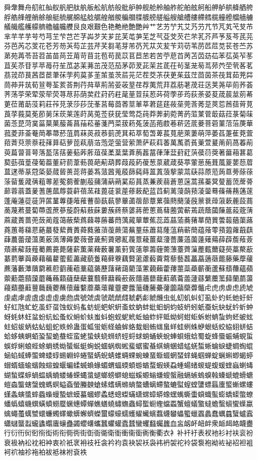 舜舝舞舟舠舡舢舣舤舥舦舧舨舩航舫般舭舮舯舰舱舲舳舴舵舶舷舸船舺舻舼舽舾舿艀艁艂艃艄艅艆艇艈艉艊艋艌艍艎艏艐艑艒艓艔艕艖艗艘艙艚艛艜艝艞艟艠艡艢艣艤艥艦艧艨艩艪艫艬艭艮良艰艱色艳艴艵艶艷艸艹艺艻艼艽艾艿芀芁节芃芄芅芆芇芈芉芊芋芌芍芎芏芐芑芒芓芔芕芖芗芘芙芚芛芜芝芞芟芠芡芢芣芤芥芦芧芨芩芪芫芬芭芮芯芰花芲芳芴芵芶芷芸芹芺芻芼芽芾芿苀苁苂苃苄苅苆苇苈苉苊苋苌苍苎苏苐苑苒苓苔苕苖苗苘苙苚苛苜苝苞苟苠苡苢苣苤若苦苧苨苩苪苫苬苭苮苯苰英苲苳苴苵苶苷苸苹苺苻苼苽苾苿茀茁茂范茄茅茆茇茈茉茊茋茌茍茎茏茐茑茒茓茔茕茖茗茘茙茚茛茜茝茞茟茠茡茢茣茤茥茦茧茨茩茪茫茬茭茮茯茰茱茲茳茴茵茶茷茸茹茺茻茼茽茾茿荀荁荂荃荄荅荆荇荈草荊荋荌荍荎荏荐荑荒荓荔荕荖荗荘荙荚荛荜荝荞荟荠荡荢荣荤荥荦荧荨荩荪荫荬荭荮药荰荱荲荳荴荵荶荷荸荹荺荻荼荽荾荿莀莁莂莃莄莅莆莇莈莉莊莋莌莍莎莏莐莑莒莓莔莕莖莗莘莙莚莛莜莝莞莟莠莡莢莣莤莥莦莧莨莩莪莫莬莭莮莯莰莱莲莳莴莵莶获莸莹莺莻莼莽莾莿菀菁菂菃菄菅菆菇菈菉菊菋菌菍菎菏菐菑菒菓菔菕菖菗菘菙菚菛菜菝菞菟菠菡菢菣菤菥菦菧菨菩菪菫菬菭菮華菰菱菲菳菴菵菶菷菸菹菺菻菼菽菾菿萀萁萂萃萄萅萆萇萈萉萊萋萌萍萎萏萐萑萒萓萔萕萖萗萘萙萚萛萜萝萞萟萠萡萢萣萤营萦萧萨萩萪萫萬萭萮萯萰萱萲萳萴萵萶萷萸萹萺萻萼落萾萿葀葁葂葃葄葅葆葇葈葉葊葋葌葍葎葏葐葑葒葓葔葕葖著葘葙葚葛葜葝葞葟葠葡葢董葤葥葦葧葨葩葪葫葬葭葮葯葰葱葲葳葴葵葶葷葸葹葺葻葼葽葾葿蒀蒁蒂蒃蒄蒅蒆蒇蒈蒉蒊蒋蒌蒍蒎蒏蒐蒑蒒蒓蒔蒕蒖蒗蒘蒙蒚蒛蒜蒝蒞蒟蒠蒡蒢蒣蒤蒥蒦蒧蒨蒩蒪蒫蒬蒭蒮蒯蒰蒱蒲蒳蒴蒵蒶蒷蒸蒹蒺蒻蒼蒽蒾蒿蓀蓁蓂蓃蓄蓅蓆蓇蓈蓉蓊蓋蓌蓍蓎蓏蓐蓑蓒蓓蓔蓕蓖蓗蓘蓙蓚蓛蓜蓝蓞蓟蓠蓡蓢蓣蓤蓥蓦蓧蓨蓩蓪蓫蓬蓭蓮蓯蓰蓱蓲蓳蓴蓵蓶蓷蓸蓹蓺蓻蓼蓽蓾蓿蔀蔁蔂蔃蔄蔅蔆蔇蔈蔉蔊蔋蔌蔍蔎蔏蔐蔑蔒蔓蔔蔕蔖蔗蔘蔙蔚蔛蔜蔝蔞蔟蔠蔡蔢蔣蔤蔥蔦蔧蔨蔩蔪蔫蔬蔭蔮蔯蔰蔱蔲蔳蔴蔵蔶蔷蔸蔹蔺蔻蔼蔽蔾蔿蕀蕁蕂蕃蕄蕅蕆蕇蕈蕉蕊蕋蕌蕍蕎蕏蕐蕑蕒蕓蕔蕕蕖蕗蕘蕙蕚蕛蕜蕝蕞蕟蕠蕡蕢蕣蕤蕥蕦蕧蕨蕩蕪蕫蕬蕭蕮蕯蕰蕱蕲蕳蕴蕵蕶蕷蕸蕹蕺蕻蕼蕽蕾蕿薀薁薂薃薄薅薆薇薈薉薊薋薌薍薎薏薐薑薒薓薔薕薖薗薘薙薚薛薜薝薞薟薠薡薢薣薤薥薦薧薨薩薪薫薬薭薮薯薰薱薲薳薴薵薶薷薸薹薺薻薼薽薾薿藀藁藂藃藄藅藆藇藈藉藊藋藌藍藎藏藐藑藒藓藔藕藖藗藘藙藚藛藜藝藞藟藠藡藢藣藤藥藦藧藨藩藪藫藬藭藮藯藰藱藲藳藴藵藶藷藸藹藺藻藼藽藾藿蘀蘁蘂蘃蘄蘅蘆蘇蘈蘉蘊蘋蘌蘍蘎蘏蘐蘑蘒蘓蘔蘕蘖蘗蘘蘙蘚蘛蘜蘝蘞蘟蘠蘡蘢蘣蘤蘥蘦蘧蘨蘩蘪蘫蘬蘭蘮蘯蘰蘱蘲蘳蘴蘵蘶蘷蘸蘹蘺蘻蘼蘽蘾蘿虀虁虂虃虄虅虆虇虈虉虊虋虌虍虎虏虐虑虒虓虔處虖虗虘虙虚虛虜虝虞號虠虡虢虣虤虥虦虧虨虩虪虫虬虭虮虯虰虱虲虳虴虵虶虷虸虹虺虻虼虽虾虿蚀蚁蚂蚃蚄蚅蚆蚇蚈蚉蚊蚋蚌蚍蚎蚏蚐蚑蚒蚓蚔蚕蚖蚗蚘蚙蚚蚛蚜蚝蚞蚟蚠蚡蚢蚣蚤蚥蚦蚧蚨蚩蚪蚫蚬蚭蚮蚯蚰蚱蚲蚳蚴蚵蚶蚷蚸蚹蚺蚻蚼蚽蚾蚿蛀蛁蛂蛃蛄蛅蛆蛇蛈蛉蛊蛋蛌蛍蛎蛏蛐蛑蛒蛓蛔蛕蛖蛗蛘蛙蛚蛛蛜蛝蛞蛟蛠蛡蛢蛣蛤蛥蛦蛧蛨蛩蛪蛫蛬蛭蛮蛯蛰蛱蛲蛳蛴蛵蛶蛷蛸蛹蛺蛻蛼蛽蛾蛿蜀蜁蜂蜃蜄蜅蜆蜇蜈蜉蜊蜋蜌蜍蜎蜏蜐蜑蜒蜓蜔蜕蜖蜗蜘蜙蜚蜛蜜蜝蜞蜟蜠蜡蜢蜣蜤蜥蜦蜧蜨蜩蜪蜫蜬蜭蜮蜯蜰蜱蜲蜳蜴蜵蜶蜷蜸蜹蜺蜻蜼蜽蜾蜿蝀蝁蝂蝃蝄蝅蝆蝇蝈蝉蝊蝋蝌蝍蝎蝏蝐蝑蝒蝓蝔蝕蝖蝗蝘蝙蝚蝛蝜蝝蝞蝟蝠蝡蝢蝣蝤蝥蝦蝧蝨蝩蝪蝫蝬蝭蝮蝯蝰蝱蝲蝳蝴蝵蝶蝷蝸蝹蝺蝻蝼蝽蝾蝿螀螁螂螃螄螅螆螇螈螉螊螋螌融螎螏螐螑螒螓螔螕螖螗螘螙螚螛螜螝螞螟螠螡螢螣螤螥螦螧螨螩螪螫螬螭螮螯螰螱螲螳螴螵螶螷螸螹螺螻螼螽螾螿蟀蟁蟂蟃蟄蟅蟆蟇蟈蟉蟊蟋蟌蟍蟎蟏蟐蟑蟒蟓蟔蟕蟖蟗蟘蟙蟚蟛蟜蟝蟞蟟蟠蟡蟢蟣蟤蟥蟦蟧蟨蟩蟪蟫蟬蟭蟮蟯蟰蟱蟲蟳蟴蟵蟶蟷蟸蟹蟺蟻蟼蟽蟾蟿蠀蠁蠂蠃蠄蠅蠆蠇蠈蠉蠊蠋蠌蠍蠎蠏蠐蠑蠒蠓蠔蠕蠖蠗蠘蠙蠚蠛蠜蠝蠞蠟蠠蠡蠢蠣蠤蠥蠦蠧蠨蠩蠪蠫蠬蠭蠮蠯蠰蠱蠲蠳蠴蠵蠶蠷蠸蠹蠺蠻蠼蠽蠾蠿血衁衂衃衄衅衆衇衈衉衊衋行衍衎衏衐衑衒術衔衕衖街衘衙衚衛衜衝衞衟衠衡衢衣衤补衦衧表衩衪衫衬衭衮衯衰衱衲衳衴衵衶衷衸衹衺衻衼衽衾衿袀袁袂袃袄袅袆袇袈袉袊袋袌袍袎袏袐袑袒袓袔袕袖袗袘袙袚袛袜袝袞袟